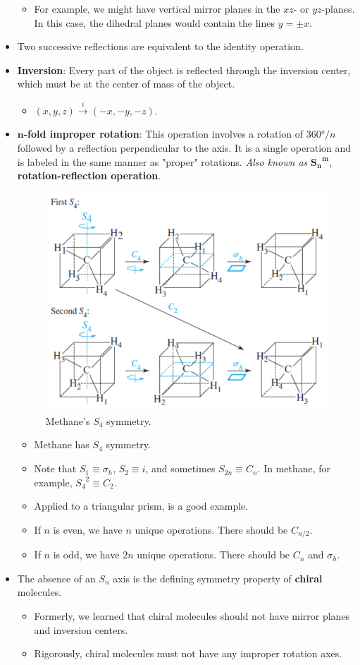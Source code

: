 \documentclass[../main.tex]{subfiles}
\begin{document}
\begin{itemize}
    \begin{itemize}
        \item For example, we might have vertical mirror planes in the $xz$- or $yz$-planes. In this case, the dihedral planes would contain the lines $y=\pm x$.
    \end{itemize}
    \item Two successive reflections are equivalent to the identity operation.
    \item \textbf{Inversion}: Every part of the object is reflected through the inversion center, which must be at the center of mass of the object.
    \begin{itemize}
        \item $(x,y,z)\xrightarrow{i}(-x,-y,-z)$.
    \end{itemize}
    \item \textbf{$\bm{n}$-fold improper rotation}: This operation involves a rotation of $\ang{360}/n$ followed by a reflection perpendicular to the axis. It is a single operation and is labeled in the same manner as "proper" rotations. \emph{Also known as} $\bm{{S_n}^m}$, \textbf{rotation-reflection operation}.
    \begin{figure}[h!]
        \centering
        \includegraphics[width=0.4\linewidth]{ExtFiles/methaneImproperRotation.png}
        \caption{Methane's $S_4$ symmetry.}
        \label{fig:methaneImproperRotation}
    \end{figure}
    \begin{itemize}
        \item Methane has $S_4$ symmetry.
        \item Note that $S_1\equiv\sigma_h$, $S_2\equiv i$, and sometimes $S_{2n}\equiv C_n$. In methane, for example, ${S_4}^2\equiv C_2$.
        \item Applied to a triangular prism, is a good example.
        \item If $n$ is even, we have $n$ unique operations. There should be $C_{n/2}$.
        \item If $n$ is odd, we have $2n$ unique operations. There should be $C_n$ and $\sigma_h$.
    \end{itemize}
    \item The absence of an $S_n$ axis is the defining symmetry property of \textbf{chiral} molecules.
    \begin{itemize}
        \item Formerly, we learned that chiral molecules should not have mirror planes and inversion centers.
        \item Rigorously, chiral molecules must not have any improper rotation axes.
    \end{itemize}
\end{itemize}
\end{document}
